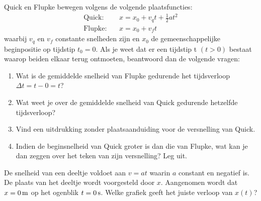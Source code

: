 \documentclass{ximera}
\begin{document}
\begin{exercise} Quick en Flupke bewegen volgens de volgende plaatsfuncties:
\begin{eqnarray*}
\mathrm{Quick:}&&x=x_0+v_qt+\frac{1}{2}at^2\\
\mathrm{Flupke:}&&x=x_0+v_ft
\end{eqnarray*}
waarbij $v_{q}$ en $v_{f}$ constante snelheden zijn en $x_0$ de gemeenschappelijke beginpositie op tijdstip $t_0=0$. Als je weet dat er een tijdstip t $(t>0)$ bestaat waarop beiden elkaar terug ontmoeten, beantwoord dan de volgende vragen:
\begin{enumerate}
\item Wat is de gemiddelde snelheid van Flupke gedurende het tijdsverloop $\Delta t=t-0=t$? 
\item Wat weet je over de gemiddelde snelheid van Quick gedurende hetzelfde tijdsverloop?
\item Vind een uitdrukking zonder plaatsaanduiding voor de versnelling van Quick. 
\item Indien de beginsnelheid van Quick groter is dan die van Flupke, wat kan je
dan zeggen over het teken van zijn versnelling? Leg uit. 
\end{enumerate}

\end{exercise}

\begin{exercise} De snelheid van een deeltje voldoet aan $v=at$ waarin $a$ constant en negatief is. De plaats van het deeltje wordt voorgesteld door $x$. Aangenomen wordt dat $x=0\rm\,m$ op het ogenblik $t=0\rm\,s$. Welke grafiek geeft het juiste verloop van $x(t)$?

\end{exercise}
\end{document}
